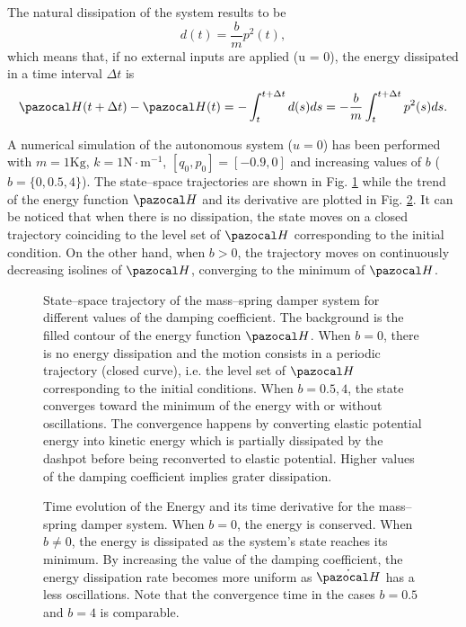 \begin{exmp}
    The natural dissipation of the system results to be
    \begin{equation}
        d(t) = \frac{b}{m}p^2(t),
    \end{equation}
    which means that, if no external inputs are applied (u = 0), the energy dissipated in a time interval $\Delta t$ is
    \begin{equation}
        \Ha(t+\Delta t) - \Ha(t) = -\int_t^{t+\Delta t}d(s)ds = -\frac{b}{m}\int_t^{t+\Delta t}p^2(s)ds.
    \end{equation}
    
    A numerical simulation of the autonomous system ($u = 0$) has been performed with $m = 1\text{Kg}$, $k = 1\text{N}\cdot\text{m}^{-1}$, $[q_0,p_0] = [-0.9,0]$ and increasing values of $b$ ($b = \{0, 0.5, 4\}$). The state--space trajectories are shown in Fig. \ref{fig:msd_ss} while the trend of the energy function $\Ha$ and its derivative are plotted in Fig. \ref{fig:msd_en}. It can be noticed that when there is no dissipation, the state moves on a closed trajectory coinciding to the level set of $\Ha$ corresponding to the initial condition. On the other hand, when $b>0$, the trajectory moves on continuously decreasing isolines of $\Ha$, converging to the minimum of $\Ha$.
    \begin{figure}[!ht]
        \centering
        
        \caption[State--space trajectory of the mass--spring damper system for different values of the damping coefficient.]{State--space trajectory of the mass--spring damper system for different values of the damping coefficient. The background is the filled contour of the energy function $\Ha$. When $b = 0$, there is no energy dissipation and the motion consists in a periodic trajectory (closed curve), i.e. the level set of $\Ha$ corresponding to the initial conditions. When $b = 0.5, 4$, the state converges toward the minimum of the energy with or without oscillations. The convergence happens by converting elastic potential energy into kinetic energy which is partially dissipated by the dashpot before being reconverted to elastic potential. Higher values of the damping coefficient implies grater dissipation.}
        \label{fig:msd_ss}
    \end{figure}
    \begin{figure}[!ht]
        \centering
        
        \caption[Time evolution of the Energy of the mass--spring damper system.]{Time evolution of the Energy and its time derivative for the mass--spring damper system. When $b=0$, the energy is conserved. When $b\neq 0$, the energy is dissipated as the system's state reaches its minimum. By increasing the value of the damping coefficient, the energy dissipation rate becomes more uniform as $\dot{\Ha}$ has a less oscillations. Note that the convergence time in the cases $b = 0.5$ and $b = 4$ is comparable.}
        \label{fig:msd_en}
    \end{figure}
\end{exmp}
